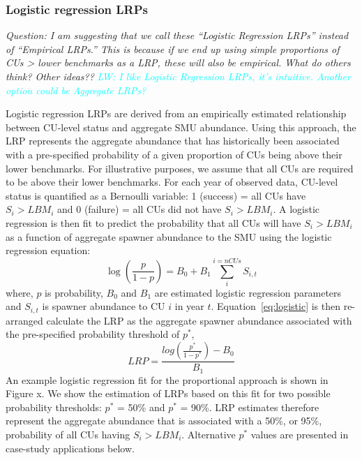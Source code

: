 \documentclass[11pt]{book}
\begin{document}
\hypertarget{logistic-regression-lrps}{%
\subsubsection{Logistic regression LRPs}\label{logistic-regression-lrps}}

\emph{Question: I am suggesting that we call these ``Logistic Regression LRPs'' instead of ``Empirical LRPs.'' This is because if we end up using simple proportions of CUs \textgreater{} lower benchmarks as a LRP, these will also be empirical. What do others think? Other ideas??} \emph{\textcolor{cyan}{LW: I like Logistic Regression LRPs, it's intuitive. Another option could be Aggregate LRPs?}}

Logistic regression LRPs are derived from an empirically estimated relationship between CU-level status and aggregate SMU abundance. Using this approach, the LRP represents the aggregate abundance that has historically been associated with a pre-specified probability of a given proportion of CUs being above their lower benchmarks. For illustrative purposes, we assume that all CUs are required to be above their lower benchmarks. For each year of observed data, CU-level status is quantified as a Bernoulli variable: 1 (success) = all CUs have \(S_i > LBM_i\) and 0 (failure) = all CUs did not have \(S_i > LBM_i\). A logistic regression is then fit to predict the probability that all CUs will have \(S_i > LBM_i\) as a function of aggregate spawner abundance to the SMU using the logistic regression equation:
\begin{equation}
  \log(\frac{p}{1-p}) = B_0 + B_1 \sum_{i}^{i=nCUs} S_{i,t}
   \label{eq:logistic}
\end{equation}
where, \(p\) is probability, \(B_0\) and \(B_1\) are estimated logistic regression parameters and \(S_{i,t}\) is spawner abundance to CU \(i\) in year \(t\). Equation~\ref{eq:logistic} is then re-arranged calculate the LRP as the aggregate spawner abundance associated with the pre-specified probability threshold of \(p^*\),
\begin{equation}
  LRP = \frac{log(\frac{p^*}{1-p^*}) - B_0}{B_1}
  \label{eq:logisticLRP}
\end{equation}
An example logistic regression fit for the proportional approach is shown in Figure x. We show the estimation of LRPs based on this fit for two possible probability thresholds: \(p^*\) = 50\% and \(p^*\) = 90\%. LRP estimates therefore represent the aggregate abundance that is associated with a 50\%, or 95\%, probability of all CUs having \(S_i > LBM_i\). Alternative \(p^*\) values are presented in case-study applications below.
\end{document}
